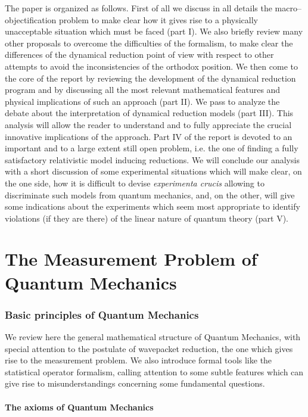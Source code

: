 \documentclass[12pt]{article}
\begin{document}
The paper is organized as follows. First of all we discuss in all
details the macro--objectification problem to make clear how it
gives rise to a physically unacceptable situation which must be
faced (part I). We also briefly review many other proposals to
overcome the difficulties of the formalism, to make clear  the
differences of the dynamical reduction point of view with respect
to  other attempts to avoid the inconsistencies of the orthodox
position. We then come to the core of the report by reviewing the
development of the dynamical reduction program and by discussing
all the most relevant mathematical features and physical
implications of such an approach (part II). We pass to analyze the debate
about the interpretation of  dynamical reduction models (part III).
This analysis will allow the reader to understand and to fully
appreciate the crucial innovative implications of the approach. Part IV
of the report is devoted to an important and to a large extent still open
problem, i.e. the one of finding a fully satisfactory relativistic
model inducing reductions.  We
will conclude our analysis with a short discussion of some
experimental situations which will make clear, on the one side,
how it is difficult to devise {\it experimenta crucis} allowing to
discriminate such models from quantum mechanics, and, on the
other, will give some indications about the experiments which seem
most appropriate to identify violations (if they are there) of the
linear nature of quantum theory (part V).

\newpage

\part{The Measurement Problem of Quantum Mechanics}

\section{Basic principles of Quantum Mechanics} \label{sec1}


We review here the general mathematical structure of Quantum
Mechanics, with special attention to the postulate of wavepacket
reduction, the one which gives rise to the measurement problem. We
also introduce formal tools like the statistical operator
formalism, calling attention to some subtle features which can
give rise to misunderstandings concerning some fundamental
questions.

\subsection{The axioms of Quantum Mechanics} \label{sec11}
\end{document}
